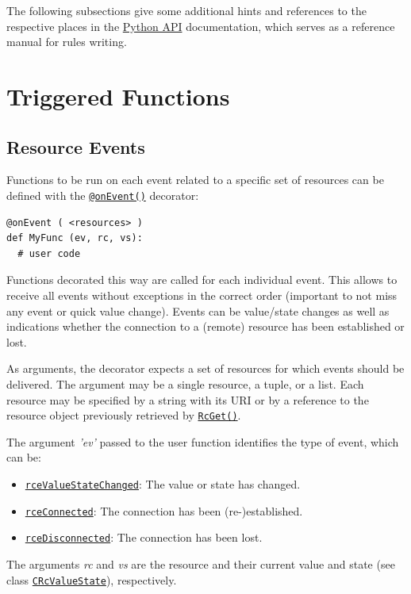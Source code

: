 \documentclass[12pt,english,parskip=half,headheight=19pt]{scrreprt}
\newcommand{\refdoc}[2]{\href{#1}{#2}}              %
\newcommand{\refapic}[1]{\href{home2l-api_c/index.html}{\mbox{\texttt{#1}}}}            %
\newcommand{\refapipython}[1]{\href{home2l-api_python/index.html}{\mbox{\texttt{#1}}}}  %
\newcommand{\theapipython}{\refdoc{home2l-api_python/index.html}{Python API}}
\begin{document}
The following subsections give some additional hints and references to the respective places in the \theapipython{} documentation, which serves as a reference manual for rules writing.



\section{Triggered Functions}
\label{sec:rules-events}


\subsection{Resource Events}

Functions to be run on each event related to a specific set of resources can be defined with the \refapipython{@onEvent()} decorator:
\begin{lstlisting}
@onEvent ( <resources> )
def MyFunc (ev, rc, vs):
  # user code
\end{lstlisting}

Functions decorated this way are called for each individual event. This allows to receive all events without exceptions in the correct order (important to not miss any event or quick value change). Events can be value/state changes as well as indications whether the connection to a (remote) resource has been established or lost.

As arguments, the decorator expects a set of resources for which events should be delivered. The argument may be a single resource, a tuple, or a list. Each resource may be specified by a string with its URI or by a reference to the resource object previously retrieved by \refapipython{RcGet()}.

The argument \textit{'ev'} passed to the user function identifies the type of event,
which can be:
\begin{itemize}
  \item \refapic{rceValueStateChanged}: The value or state has changed.
  \item \refapic{rceConnected}: The connection has been (re-)established.
  \item \refapic{rceDisconnected}: The connection has been lost.
\end{itemize}
The arguments \textit{rc} and \textit{vs} are the resource and their
current value and state (see class \refapic{CRcValueState}), respectively.
\end{document}
